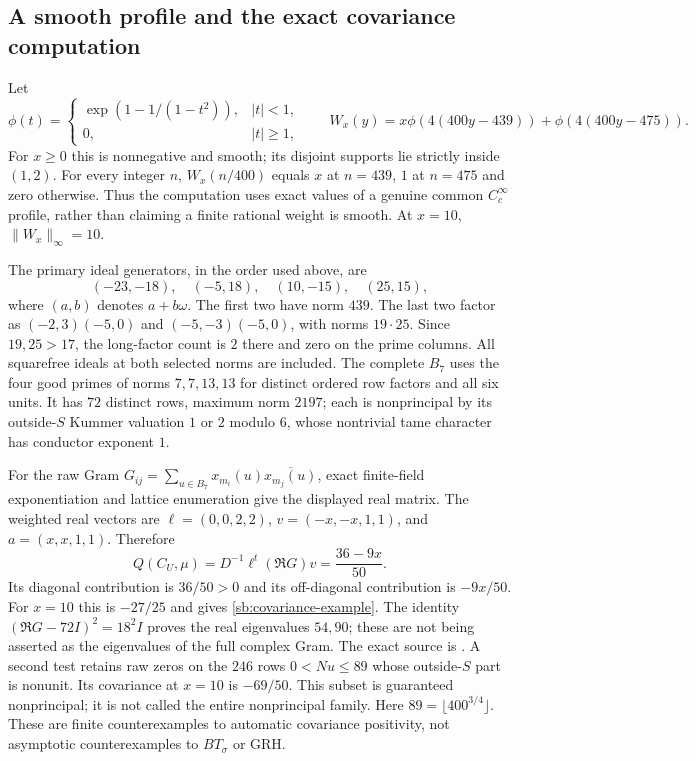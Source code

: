 \documentclass[11pt]{article}
\theoremstyle{definition}\newtheorem{definition}[theorem]{Definition}
\theoremstyle{remark}\newtheorem{remark}[theorem]{Remark}
\begin{document}
\subsection{A smooth profile and the exact covariance computation}
Let
\[
 \phi(t)=\begin{cases}\exp(1-1/(1-t^2)),&|t|<1,\\0,&|t|\ge1,\end{cases}
 \qquad W_x(y)=x\phi(4(400y-439))+\phi(4(400y-475)).
\]
For $x\ge0$ this is nonnegative and smooth; its disjoint supports lie
strictly inside $(1,2)$. For every integer $n$, $W_x(n/400)$ equals
$x$ at $n=439$, $1$ at $n=475$ and zero otherwise. Thus the computation
uses exact values of a genuine common $C_c^\infty$ profile, rather than
claiming a finite rational weight is smooth. At $x=10$, $\|W_x\|_\infty=10$.

The primary ideal generators, in the order used above, are
\[
 (-23,-18),\quad(-5,18),\quad(10,-15),\quad(25,15),
\]
where $(a,b)$ denotes $a+b\omega$. The first two have norm $439$.
The last two factor as $(-2,3)(-5,0)$ and $(-5,-3)(-5,0)$, with norms
$19\cdot25$. Since $19,25>17$, the long-factor count is $2$ there and
zero on the prime columns. All squarefree ideals at both selected norms
are included. The complete $B_7$ uses the four good primes of norms
$7,7,13,13$ for distinct ordered row factors and all six units. It has
$72$ distinct rows, maximum norm $2197$; each is nonprincipal by its
outside-$S$ Kummer valuation $1$ or $2$ modulo $6$, whose nontrivial
tame character has conductor exponent $1$.

For the raw Gram $G_{ij}=\sum_{u\in B_7}x_{m_i}(u)
\overline{x_{m_j}(u)}$, exact finite-field exponentiation and lattice
enumeration give the displayed real matrix. The weighted real vectors are
$\ell=(0,0,2,2)$, $v=(-x,-x,1,1)$, and $a=(x,x,1,1)$.
Therefore
\[
 Q(C_U,\mu)=D^{-1}\ell^t(\Re G)v=\frac{36-9x}{50}.
\]
Its diagonal contribution is $36/50>0$ and its off-diagonal contribution
is $-9x/50$. For $x=10$ this is $-27/25$ and gives
\eqref{sb:covariance-example}. The identity
$(\Re G-72I)^2=18^2I$ proves the real eigenvalues $54,90$;
these are not being asserted as the eigenvalues of the full complex Gram.
The exact source is .
A second test retains raw zeros on the $246$ rows $0<Nu\le89$ whose
outside-$S$ part is nonunit. Its covariance at $x=10$ is $-69/50$.
This subset is guaranteed nonprincipal; it is not called the entire
nonprincipal family. Here $89=\lfloor400^{3/4}\rfloor$.
These are finite counterexamples to automatic covariance positivity,
not asymptotic counterexamples to $BT_\sigma$ or GRH.
\end{document}
